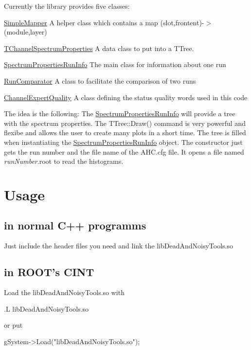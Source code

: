 Currently the library provides five classes\-: \begin{DoxyItemize}
\item \hyperlink{class_simple_mapper}{Simple\-Mapper} A helper class which contains a map (slot,frontent)-\/$>$(module,layer) \item \hyperlink{class_t_channel_spectrum_properties}{T\-Channel\-Spectrum\-Properties} A data class to put into a T\-Tree. \item \hyperlink{class_spectrum_properties_run_info}{Spectrum\-Properties\-Run\-Info} The main class for information about one run \item \hyperlink{class_run_comparator}{Run\-Comparator} A class to facilitate the comparison of two runs \item \hyperlink{class_channel_expert_quality}{Channel\-Expert\-Quality} A class defining the status quality words used in this code\end{DoxyItemize}
The idea is the following\-: The \hyperlink{class_spectrum_properties_run_info}{Spectrum\-Properties\-Run\-Info} will provide a tree with the spectrum properties. The T\-Tree\-::\-Draw() command is very powerful and flexibe and allows the user to create many plots in a short time. The tree is filled when instantiating the \hyperlink{class_spectrum_properties_run_info}{Spectrum\-Properties\-Run\-Info} object. The constructor just gets the run number and the file name of the A\-H\-C.\-cfg file. It opens a file named {\itshape run\-Number}.root to read the histograms.\hypertarget{root_lib_Usage}{}\section{Usage}\label{root_lib_Usage}
\hypertarget{root_lib_Cplusplus}{}\subsection{in normal C++ programms}\label{root_lib_Cplusplus}
Just include the header files you need and link the lib\-Dead\-And\-Noisy\-Tools.\-so\hypertarget{root_lib_Root}{}\subsection{in R\-O\-O\-T's C\-I\-N\-T}\label{root_lib_Root}
Load the lib\-Dead\-And\-Noisy\-Tools.\-so with \begin{DoxyVerb}.L libDeadAndNoisyTools.so \end{DoxyVerb}
 or put \begin{DoxyVerb}gSystem->Load("libDeadAndNoisyTools.so"); \end{DoxyVerb}
